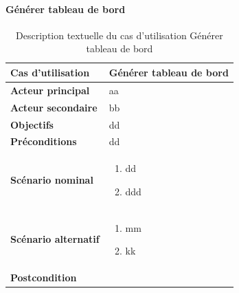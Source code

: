         \paragraph[Générer tableau de bord]{Générer tableau de bord}
        \begin{longtable}{p{4cm} p{9cm}}
            \caption{Description textuelle du cas d’utilisation Générer tableau de bord}
            \label{table:usecaseDashboard}
            \\\hline\hline
                \textbf{Cas d’utilisation} & \textbf{Générer tableau de bord}
            \\\hline\hline
                    \textbf{Acteur principal} & aa
                \\
                    \textbf{Acteur secondaire} & bb
                \\
                    \textbf{Objectifs} & dd
                \\
                    \textbf{Préconditions} & dd
                \\
                \textbf{Scénario nominal} &
                    \begin{enumerate}[leftmargin=*]
                        \item dd
                        \item ddd
                    \end{enumerate}
                \\
                \textbf{Scénario alternatif} &
                    \begin{enumerate}[leftmargin=*]
                        \item mm
                        \item kk
                    \end{enumerate}
                \\
                \textbf{Postcondition}
            \\\bottomrule
        \end{longtable}

